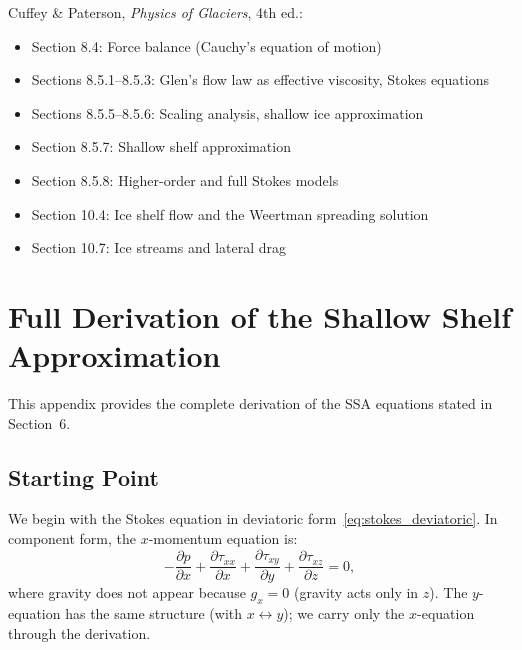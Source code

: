 \documentclass[11pt]{article}
\begin{document}
Cuffey \& Paterson, \textit{Physics of Glaciers}, 4th ed.:
\begin{itemize}
  \item Section 8.4: Force balance (Cauchy's equation of motion)
  \item Sections 8.5.1--8.5.3: Glen's flow law as effective viscosity, Stokes equations
  \item Sections 8.5.5--8.5.6: Scaling analysis, shallow ice approximation
  \item Section 8.5.7: Shallow shelf approximation
  \item Section 8.5.8: Higher-order and full Stokes models
  \item Section 10.4: Ice shelf flow and the Weertman spreading solution
  \item Section 10.7: Ice streams and lateral drag
\end{itemize}

\appendix
\section{Full Derivation of the Shallow Shelf Approximation}
\label{app:ssa}

This appendix provides the complete derivation of the SSA equations stated in Section~6.

\subsection{Starting Point}

We begin with the Stokes equation in deviatoric form~\eqref{eq:stokes_deviatoric}.  In component form, the $x$-momentum equation is:
\begin{equation}
  -\frac{\partial p}{\partial x} + \frac{\partial \tau_{xx}}{\partial x} + \frac{\partial \tau_{xy}}{\partial y} + \frac{\partial \tau_{xz}}{\partial z} = 0,
  \label{eq:app_x_full}
\end{equation}
where gravity does not appear because $g_x = 0$ (gravity acts only in $z$).  The $y$-equation has the same structure (with $x \leftrightarrow y$); we carry only the $x$-equation through the derivation.
\end{document}
